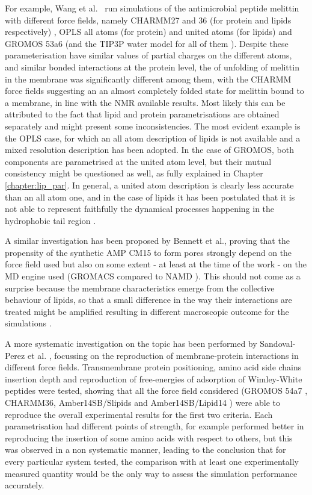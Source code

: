 For example, Wang et al.\ \cite{Wang2014} run simulations of the antimicrobial peptide melittin with different force fields, namely CHARMM27 and 36 (for protein and lipids respectively) \cite{MacKerell1998,Klauda2010}, OPLS all atoms (for protein) and united atoms (for lipids) \cite{Jorgensen1996} and GROMOS 53a6 \cite{Oostenbrink2004} (and the TIP3P water model for all of them \cite{Jorgensen1983}).
%
Despite these parameterisation have similar values of partial charges on the different atoms, and similar bonded interactions at the protein level, the of unfolding of melittin in the membrane was significantly different among them, with the CHARMM force fields suggesting an an almost completely folded state for melittin bound to a membrane, in line with the NMR available results. Most likely this can be attributed to the fact that lipid and protein parametrisations are obtained separately and might present some inconsistencies. The most evident example is the OPLS case, for which an all atom description of lipids is not available and a mixed resolution description has been adopted. In the case of GROMOS, both components are parametrised at the united atom level, but their mutual consistency might be questioned as well, as fully explained in Chapter \ref{chapter:lip_par}. In general, a united atom description is clearly less accurate than an all atom one, and in the case of lipids it has been postulated that it is not able to represent faithfully the dynamical processes happening in the hydrophobic tail region \cite{Chowdhary2013}.

A similar investigation has been proposed by Bennett et al., proving that the propensity of the synthetic AMP CM15 to form pores strongly depend on the force field used but also on some extent - at least at the time of the work - on the MD engine used (GROMACS compared to NAMD \cite{Phillips2005}). This should not come as a surprise because the membrane characteristics emerge from the collective behaviour of lipids, so that a small difference in the way their interactions are treated might be amplified resulting in different macroscopic outcome for the simulations \cite{Bennett2016}.

A more systematic investigation on the topic has been performed by Sandoval-Perez et al. \cite{Sandoval-Perez2017}, focussing on the reproduction of membrane-protein interactions in different force fields. Transmembrane protein positioning, amino acid side chains insertion depth and reproduction of free-energies of adsorption of Wimley-White peptides were tested, showing that all the force field considered (GROMOS 54a7 \cite{Schmid2011}, CHARMM36, Amber14SB/Slipids \cite{Jambeck2012} and Amber14SB/Lipid14 \cite{Dickson2014}) were able to reproduce the overall experimental results for the first two criteria. Each parametrisation had different points of strength, for example performed better in reproducing the insertion of some amino acids with respect to others, but this was observed in a non systematic manner, leading to the conclusion that for every particular system tested, the comparison with at least one experimentally measured quantity would be the only way to assess the simulation performance accurately.


